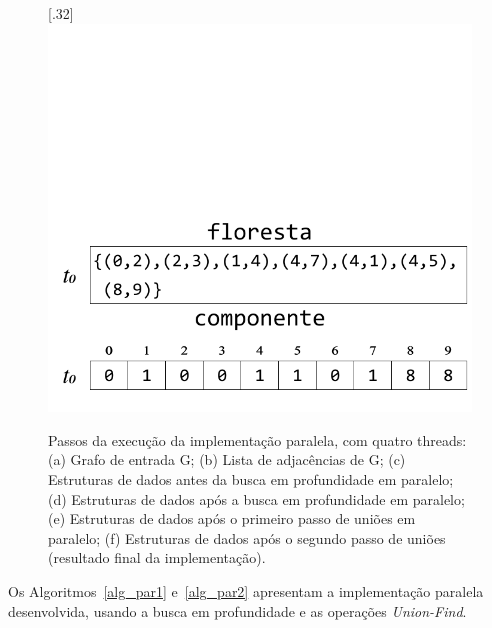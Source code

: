 \documentclass[12pt]{article}
\begin{document}
\begin{figure}[!htb]
{	}
	\subcaptionbox{}[.32\textwidth]
	{
		\includegraphics[width=.32\textwidth]{figF.pdf}
	}
	\caption{Passos da execução da implementação paralela, com quatro threads: (a) Grafo de entrada G; (b) Lista de adjacências de G; (c) Estruturas de dados antes da busca em profundidade em paralelo; (d) Estruturas de dados após a busca em profundidade em paralelo; (e) Estruturas de dados após o primeiro passo de uniões em paralelo; (f) Estruturas de dados após o segundo passo de uniões (resultado final da implementação).}
		\label{fig:1}
\end{figure}

Os Algoritmos~\ref{alg_par1} e~\ref{alg_par2} apresentam a implementação paralela desenvolvida, usando a busca em profundidade e as operações \emph{Union-Find}.
\end{document}
